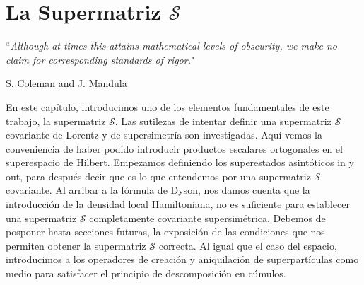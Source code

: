 
\chapter{La Supermatriz $ \mathcal{S} $}
\label{chap 3}
\epigraph{``\textit{Although at times this attains mathematical levels of obscurity, we
make no claim for corresponding standards of rigor.}"}{S. Coleman and J. Mandula~\cite{Coleman:1967ad}}

En este capítulo, introducimos uno de los elementos fundamentales de este trabajo, la supermatriz $ \mathcal{S} $. Las sutilezas de intentar definir una supermatriz $ \mathcal{S} $ covariante de Lorentz y de supersimetría son investigadas. Aquí vemos la conveniencia de haber podido  introducir  productos escalares ortogonales en el superespacio de Hilbert.  Empezamos definiendo los superestados asintóticos in y out, para después decir que es lo que entendemos por una supermatriz $ \mathcal{S} $ covariante. Al  arribar a la fórmula de Dyson, nos damos cuenta que la introducción de la densidad local Hamiltoniana, no es suficiente para establecer una supermatriz $ \mathcal{S} $ completamente  covariante supersimétrica. Debemos de posponer hasta secciones futuras, la exposición de las condiciones  que nos permiten obtener la supermatriz $ \mathcal{S} $ correcta.  Al igual que el caso del espacio, introducimos a los operadores de creación y aniquilación de superpartículas como medio para satisfacer el principio de descomposición en cúmulos.
